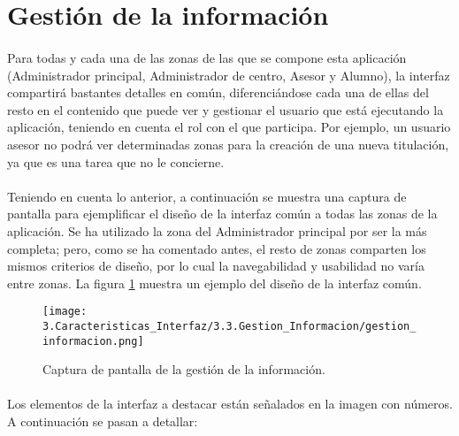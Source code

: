 \section{Gestión de la información}\label{gestionInformacion}

  \paragraph{}Para todas y cada una de las zonas de las que se compone esta
  aplicación (Administrador principal, Administrador de centro, Asesor y
  Alumno), la interfaz compartirá bastantes detalles en común, diferenciándose
  cada una de ellas del resto en el contenido que puede ver y gestionar el
  usuario que está ejecutando la aplicación, teniendo en cuenta el rol con el
  que participa. Por ejemplo, un usuario asesor no podrá ver determinadas zonas
  para la creación de una nueva titulación, ya que es una tarea que no le
  concierne.

  \paragraph{}Teniendo en cuenta lo anterior, a continuación se muestra una
  captura de pantalla para ejemplificar el diseño de la interfaz común a todas
  las zonas de la aplicación. Se ha utilizado la zona del Administrador
  principal por ser la más completa; pero, como se ha comentado antes, el resto
  de zonas comparten los mismos criterios de diseño, por lo cual la
  navegabilidad y usabilidad no varía entre zonas. La figura
  \ref{capturaGestionInformacion} muestra un ejemplo del diseño de la interfaz
  común.

  \begin{figure}[!ht]
    \begin{center}
      \texttt{[image: 3.Caracteristicas\_Interfaz/3.3.Gestion\_Informacion/gestion\_informacion.png]}
      \caption{Captura de pantalla de la gestión de la información.}
      \label{capturaGestionInformacion}
    \end{center}
  \end{figure}


  \paragraph{}Los elementos de la interfaz a destacar están señalados en la
  imagen con números. A continuación se pasan a detallar:

